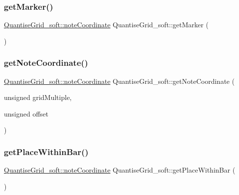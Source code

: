 \mbox{\label{classQuantiseGrid__soft_af75a096d63f430fb9190d0622b55712f}} 
\subsubsection{\texorpdfstring{get\+Marker()}{getMarker()}}
{\footnotesize\ttfamily \mbox{\hyperlink{structQuantiseGrid__soft_1_1noteCoordinate}{Quantise\+Grid\+\_\+soft\+::note\+Coordinate}} Quantise\+Grid\+\_\+soft\+::get\+Marker (\begin{DoxyParamCaption}{ }\end{DoxyParamCaption})}

\mbox{\label{classQuantiseGrid__soft_a7831011191c8f3aae5bbe02105599b56}} 
\subsubsection{\texorpdfstring{get\+Note\+Coordinate()}{getNoteCoordinate()}}
{\footnotesize\ttfamily \mbox{\hyperlink{structQuantiseGrid__soft_1_1noteCoordinate}{Quantise\+Grid\+\_\+soft\+::note\+Coordinate}} Quantise\+Grid\+\_\+soft\+::get\+Note\+Coordinate (\begin{DoxyParamCaption}\item[{unsigned}]{grid\+Multiple,  }\item[{unsigned}]{offset }\end{DoxyParamCaption})}

\mbox{\label{classQuantiseGrid__soft_a379f20a256203270ddfbee891558fc4e}} 
\subsubsection{\texorpdfstring{get\+Place\+Within\+Bar()}{getPlaceWithinBar()}}
{\footnotesize\ttfamily \mbox{\hyperlink{structQuantiseGrid__soft_1_1noteCoordinate}{Quantise\+Grid\+\_\+soft\+::note\+Coordinate}} Quantise\+Grid\+\_\+soft\+::get\+Place\+Within\+Bar (\begin{DoxyParamCaption}{ }\end{DoxyParamCaption})}

